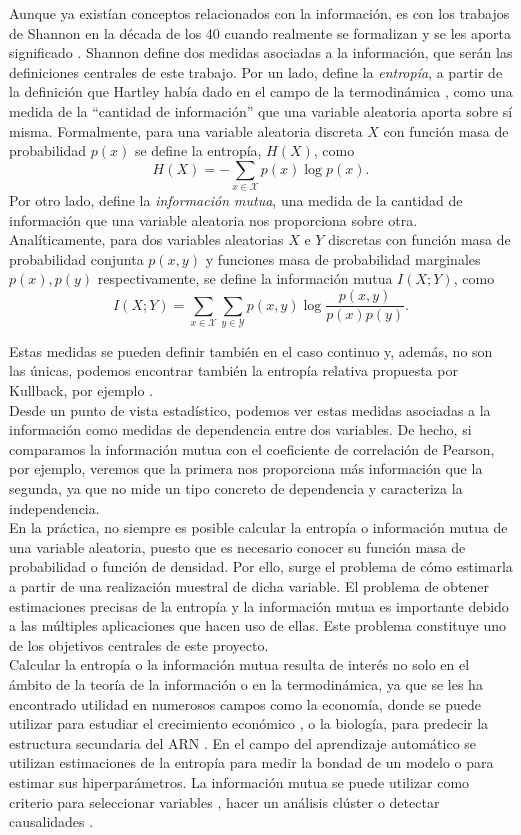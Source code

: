 \documentclass[12pt,a4paper]{report} %
\theoremstyle{definition}
\begin{document}
Aunque ya existían conceptos relacionados con la información, es con los trabajos de Shannon en la década de los 40 cuando realmente se formalizan y se les aporta significado \cite{shannon}. Shannon define dos medidas asociadas a la información, que serán las definiciones centrales de este trabajo. Por un lado, define la \textit{entropía}, a partir de la definición que Hartley había dado en el campo de la termodinámica \cite{hartley}, como una medida de la ``cantidad de información'' que una variable aleatoria aporta sobre sí misma. Formalmente, para una variable aleatoria discreta $X$ con función masa de probabilidad $p(x)$ se define la entropía, $H(X)$, como\[
H(X) = -\sum_{x\in \mathcal{X}}p(x)\log p(x).
\] Por otro lado, define la \textit{información mutua}, una medida de la cantidad de información que una variable aleatoria nos proporciona sobre otra. Analíticamente, para dos variables aleatorias $X$ e $Y$ discretas con función masa de probabilidad conjunta $p(x,y)$ y funciones masa de probabilidad marginales $p(x), p(y)$ respectivamente, se define la información mutua $I(X;Y)$, como\[
I(X;Y) = \sum_{x\in \mathcal{X}}\sum_{y \in \mathcal{Y}}p(x,y)\log\frac{p(x,y)}{p(x)p(y)}.
\]

Estas medidas se pueden definir también en el caso continuo y, además, no son las únicas, podemos encontrar también la entropía relativa propuesta por Kullback, por ejemplo \cite{thomas}.\\

Desde un punto de vista estadístico, podemos ver estas medidas asociadas a la información como medidas de dependencia entre dos variables. De hecho, si comparamos la información mutua con el coeficiente de correlación de Pearson, por ejemplo, veremos que la primera nos proporciona más información que la segunda, ya que no mide un tipo concreto de dependencia y caracteriza la independencia.\\

En la práctica, no siempre es posible calcular la entropía o información mutua de una variable aleatoria, puesto que es necesario conocer su función masa de probabilidad o función de densidad. Por ello, surge el problema de cómo estimarla a partir de una realización muestral de dicha variable. El problema de obtener estimaciones precisas de la entropía y la información mutua es importante debido a las múltiples aplicaciones que hacen uso de ellas. Este problema constituye uno de los objetivos centrales de este proyecto.\\

Calcular la entropía o la información mutua resulta de interés no solo en el ámbito de la teoría de la información o en la termodinámica, ya que se les ha encontrado utilidad en numerosos campos como la economía, donde se puede utilizar para estudiar el crecimiento económico \cite{economy}, o la biología, para predecir la estructura secundaria del ARN \cite{freyhult}. En el campo del aprendizaje automático se utilizan estimaciones de la entropía para medir la bondad de un modelo \cite{anewclass} o para estimar sus hiperparámetros. La información mutua se puede utilizar como criterio para seleccionar variables \cite{feature}, hacer un análisis clúster \cite{cluster} o detectar causalidades \cite{causality}.\\
\end{document}
